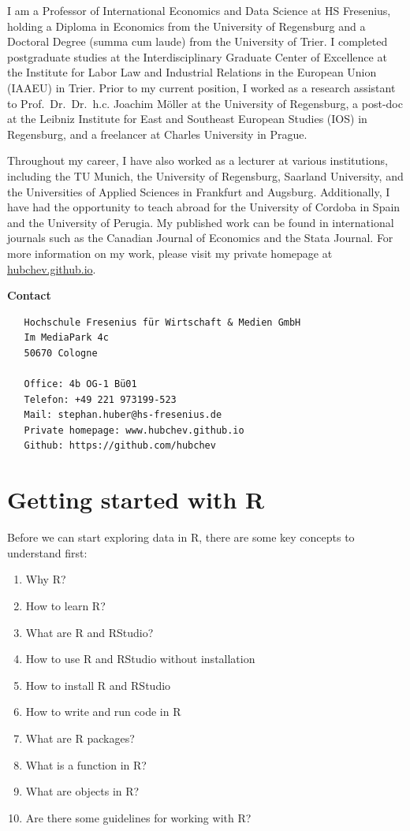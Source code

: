 \documentclass[
  12pt,
  oneside]{book}
\providecommand{\tightlist}{%
  \setlength{\itemsep}{0pt}\setlength{\parskip}{0pt}}
\theoremstyle{definition}
\theoremstyle{definition}
\theoremstyle{definition}
\theoremstyle{definition}
\theoremstyle{remark}
\begin{document}
I am a Professor of International Economics and Data Science at HS Fresenius, holding a Diploma in Economics from the University of Regensburg and a Doctoral Degree (summa cum laude) from the University of Trier. I completed postgraduate studies at the Interdisciplinary Graduate Center of Excellence at the Institute for Labor Law and Industrial Relations in the European Union (IAAEU) in Trier. Prior to my current position, I worked as a research assistant to Prof.~Dr.~Dr.~h.c. Joachim Möller at the University of Regensburg, a post-doc at the Leibniz Institute for East and Southeast European Studies (IOS) in Regensburg, and a freelancer at Charles University in Prague.

Throughout my career, I have also worked as a lecturer at various institutions, including the TU Munich, the University of Regensburg, Saarland University, and the Universities of Applied Sciences in Frankfurt and Augsburg. Additionally, I have had the opportunity to teach abroad for the University of Cordoba in Spain and the University of Perugia. My published work can be found in international journals such as the Canadian Journal of Economics and the Stata Journal. For more information on my work, please visit my private homepage at \href{www.hubchev.github.io}{hubchev.github.io}.

\textbf{Contact}

\begin{verbatim}
   Hochschule Fresenius für Wirtschaft & Medien GmbH
   Im MediaPark 4c
   50670 Cologne
   
   Office: 4b OG-1 Bü01 
   Telefon: +49 221 973199-523
   Mail: stephan.huber@hs-fresenius.de
   Private homepage: www.hubchev.github.io
   Github: https://github.com/hubchev
\end{verbatim}

\hypertarget{getting-started}{%
\chapter{Getting started with R}\label{getting-started}}

Before we can start exploring data in R, there are some key concepts to understand first:

\begin{enumerate}
\def\labelenumi{\arabic{enumi}.}
\tightlist
\item
  Why R?
\item
  How to learn R?
\item
  What are R and RStudio?
\item
  How to use R and RStudio without installation
\item
  How to install R and RStudio
\item
  How to write and run code in R
\item
  What are R packages?
\item
  What is a function in R?
\item
  What are objects in R?
\item
  Are there some guidelines for working with R?
\end{enumerate}
\end{document}
